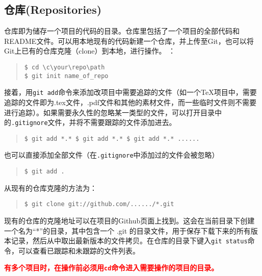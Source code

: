 \documentclass{article}
\begin{document}
		\subsection{仓库(Repositories)}
			仓库即为储存一个项目的代码的目录。仓库里包括了一个项目的全部代码和README文件。可以用本地现有的代码新建一个仓库，并上传至Git，也可以将Git上已有的仓库克隆（clone）到本地，进行操作。
			：
				\begin{quote}
					\begin{lstlisting}
$ cd \c\your\repo\path
$ git init name_of_repo
					\end{lstlisting}
				\end{quote}
			\par 接着，用{\tt git add}命令来添加改项目中需要追踪的文件（如一个TeX项目中，需要追踪的文件即为.tex文件，.pdf文件和其他的素材文件，而一些临时文件则不需要进行追踪）。如果需要永久性的忽略某一类型的文件，可以打开目录中的{\tt .gitignore}文件，并将不需要跟踪的文件添加进去。
			\begin{quote}
				\begin{lstlisting}
$ git add *.* $ git add *.* $ git add *.* ......
				\end{lstlisting}
			\end{quote}
			也可以直接添加全部文件（在{\tt .gitignore}中添加过的文件会被忽略）
			\begin{quote}
				\begin{lstlisting}
$ git add .
				\end{lstlisting}
			\end{quote}
			\par 从现有的仓库克隆的方法为：
			\begin{quote}
				\begin{lstlisting}
$ git clone git://github.com/....../*.git
				\end{lstlisting}
			\end{quote}
			\par 现有的仓库的克隆地址可以在项目的Github页面上找到。这会在当前目录下创建一个名为“*”的目录，其中包含一个 .git 的目录文件，用于保存下载下来的所有版本记录，然后从中取出最新版本的文件拷贝。在仓库的目录下键入{\tt git status}命令，可以查看已跟踪和未跟踪的文件列表。
			\par{\bf\textcolor{red}{有多个项目时，在操作前必须用{\tt cd}命令进入需要操作的项目的目录。}}
\end{document}
